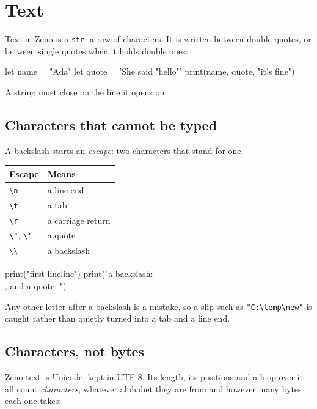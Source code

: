 \chapter{Text}\label{ch-text}

Text in Zeno is a \verb|str|: a row of characters. It is written
between double quotes, or between single quotes when it holds double
ones:

\begin{zeno}
let name = "Ada"
let quote = 'She said "hello"'
print(name, quote, "it's fine")
\end{zeno}

A string must close on the line it opens on.

\section{Characters that cannot be typed}

A backslash starts an \emph{escape}: two characters that stand for one.

\begin{center}
\begin{tabular}{ll}
\toprule
Escape & Means \\
\midrule
\verb|\n| & a line end \\
\verb|\t| & a tab \\
\verb|\r| & a carriage return \\
\verb|\"|, \verb|\'| & a quote \\
\verb|\\| & a backslash \\
\bottomrule
\end{tabular}
\end{center}

\begin{zeno}
print("first line\nsecond line")
print("a backslash: \\, and a quote: \"")
\end{zeno}

Any other letter after a backslash is a mistake, so a slip such as
\verb|"C:\temp\new"| is caught rather than quietly turned into a tab
and a line end.

\section{Characters, not bytes}

Zeno text is Unicode, kept in UTF-8. Its length, its positions and a
loop over it all count \emph{characters}, whatever alphabet they are
from and however many bytes each one takes:

